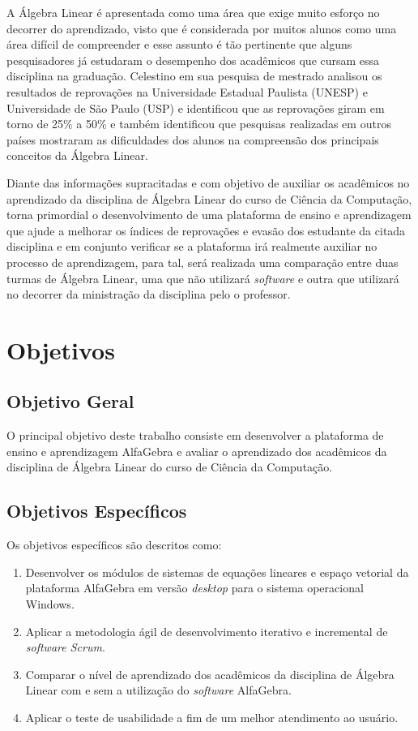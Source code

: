 A Álgebra Linear é apresentada como uma área que exige muito esforço no decorrer do aprendizado, visto que é considerada por muitos alunos como uma área difícil de compreender e esse assunto é tão pertinente que alguns pesquisadores já estudaram o desempenho dos acadêmicos que cursam essa disciplina na graduação. Celestino \cite{2000:celestino} em sua pesquisa de mestrado analisou os resultados de reprovações na Universidade Estadual Paulista (UNESP) e Universidade de São Paulo (USP) e identificou que as reprovações giram em torno de 25\% a 50\% e também identificou que pesquisas realizadas em outros países mostraram as dificuldades dos alunos na compreensão dos principais conceitos da Álgebra Linear.

Diante das informações supracitadas e com objetivo de auxiliar os acadêmicos no aprendizado da disciplina de Álgebra Linear do curso de Ciência da Computação, torna primordial o desenvolvimento de uma plataforma de ensino e aprendizagem que ajude a melhorar os índices de reprovações e evasão dos estudante da citada disciplina e em conjunto verificar se a plataforma irá realmente auxiliar no processo de aprendizagem, para tal, será realizada uma comparação entre duas turmas de Álgebra Linear, uma que não utilizará \textit{software} e outra que utilizará no decorrer da ministração da disciplina pelo o professor.  

\section{Objetivos}

\subsection{Objetivo Geral}

\noindent O principal objetivo deste trabalho consiste em desenvolver a plataforma de ensino e aprendizagem AlfaGebra e avaliar o aprendizado dos acadêmicos da disciplina de Álgebra Linear do curso de Ciência da Computação.

\subsection{Objetivos Específicos}

Os objetivos específicos são descritos como:

\begin{enumerate}
    \item Desenvolver os módulos de sistemas de equações lineares e espaço vetorial da plataforma AlfaGebra em versão \textit{desktop} para o sistema operacional Windows.
	
	\item Aplicar a metodologia ágil de desenvolvimento iterativo e incremental de \textit{software Scrum}.
	
	\item Comparar o nível de aprendizado dos acadêmicos da disciplina de Álgebra Linear com e sem a utilização do \textit{software} AlfaGebra.
	
	\item Aplicar o teste de usabilidade a fim de um melhor atendimento ao usuário.
\end{enumerate}

